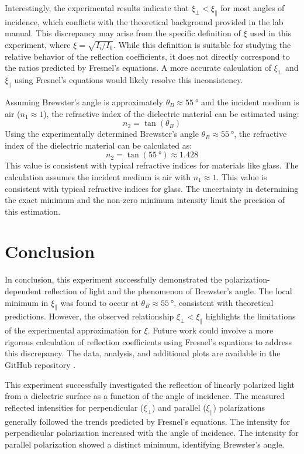 \documentclass[journal]{IEEEtran}
\begin{document}
Interestingly, the experimental results indicate that $\xi_{\perp} < \xi_{\parallel}$ for most angles of incidence, which conflicts with the theoretical background provided in the lab manual. This discrepancy may arise from the specific definition of $\xi$ used in this experiment, where $\xi = \sqrt{I_i / I_0}$. While this definition is suitable for studying the relative behavior of the reflection coefficients, it does not directly correspond to the ratios predicted by Fresnel's equations. A more accurate calculation of $\xi_{\perp}$ and $\xi_{\parallel}$ using Fresnel's equations would likely resolve this inconsistency.

Assuming Brewster's angle is approximately $\theta_B \approx \SI{55}{\degree}$ and the incident medium is air ($n_1 \approx 1$), the refractive index of the dielectric material can be estimated using:
\begin{equation}
    n_2 = \tan(\theta_B)
\end{equation}
Using the experimentally determined Brewster's angle $\theta_B \approx \SI{55}{\degree}$, the refractive index of the dielectric material can be calculated as:
\begin{equation}
    n_2 = \tan(\SI{55}{\degree}) \approx 1.428
\end{equation}
This value is consistent with typical refractive indices for materials like glass. The calculation assumes the incident medium is air with $n_1 \approx 1$.
This value is consistent with typical refractive indices for glass. The uncertainty in determining the exact minimum and the non-zero minimum intensity limit the precision of this estimation.

\section{Conclusion}
In conclusion, this experiment successfully demonstrated the polarization-dependent reflection of light and the phenomenon of Brewster's angle. The local minimum in $\xi_{\parallel}$ was found to occur at $\theta_B \approx \SI{55}{\degree}$, consistent with theoretical predictions. However, the observed relationship $\xi_{\perp} < \xi_{\parallel}$ highlights the limitations of the experimental approximation for $\xi$. Future work could involve a more rigorous calculation of reflection coefficients using Fresnel's equations to address this discrepancy.
The data, analysis, and additional plots are available in the GitHub repository \cite{github}.

This experiment successfully investigated the reflection of linearly polarized light from a dielectric surface as a function of the angle of incidence. The measured reflected intensities for perpendicular ($\xi_{\perp}$) and parallel ($\xi_{\parallel}$) polarizations generally followed the trends predicted by Fresnel's equations. The intensity for perpendicular polarization increased with the angle of incidence. The intensity for parallel polarization showed a distinct minimum, identifying Brewster's angle.
\end{document}
